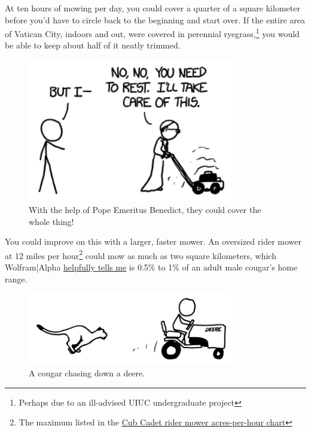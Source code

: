 {{At ten hours of mowing per day, you could cover a quarter of a square kilometer before you'd have to circle back to the beginning and start over. If the entire area of Vatican City, indoors and out, were covered in perennial ryegrass,{\footnote{Perhaps due to an ill-advised UIUC undergraduate project} } you would be able to keep about half of it neatly trimmed.}

\begin{figure}[!htbp]
\centering
\includegraphics[scale=0.5, max width=0.8\textwidth]{imgs/a/70/lawn_pope.png}
\caption{With the help of Pope Emeritus Benedict, they could cover the whole thing!}
\end{figure}

{You could improve on this with a larger, faster mower. An oversized rider mower at 12 miles per hour{\footnote{The maximum listed in the \href{http://www.cubcadet.com/webapp/wcs/stores/servlet/CubCadetFullPageArticleDisplayView?langId=-1&storeId=10051&catalogId=14101&pageView=Cubcadet\_Commercial/AcresPerHour.html}{Cub Cadet rider mower acres-per-hour chart}} } could mow as much as two square kilometers, which Wolfram|Alpha \href{http://www.wolframalpha.com/input/?i=2+km\%5E2}{helpfully tells me} is 0.5\% to 1\% of an adult male cougar's home range.}

\begin{figure}[!htbp]
\centering
\includegraphics[scale=0.5, max width=0.8\textwidth]{imgs/a/70/lawn_cougar.png}
\caption{A cougar chasing down a deere.}
\end{figure}

}
